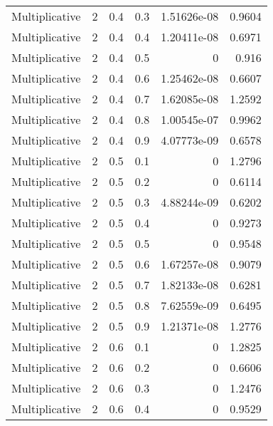 \documentclass{article}
\begin{document}
\begin{longtable}[H]{lrrrrr}
 Multiplicative &       2 &   0.4 &            0.3 &      1.51626e-08 &          0.9604 \\
 Multiplicative &       2 &   0.4 &            0.4 &      1.20411e-08 &          0.6971 \\
 Multiplicative &       2 &   0.4 &            0.5 &      0           &          0.916  \\
 Multiplicative &       2 &   0.4 &            0.6 &      1.25462e-08 &          0.6607 \\
 Multiplicative &       2 &   0.4 &            0.7 &      1.62085e-08 &          1.2592 \\
 Multiplicative &       2 &   0.4 &            0.8 &      1.00545e-07 &          0.9962 \\
 Multiplicative &       2 &   0.4 &            0.9 &      4.07773e-09 &          0.6578 \\
 Multiplicative &       2 &   0.5 &            0.1 &      0           &          1.2796 \\
 Multiplicative &       2 &   0.5 &            0.2 &      0           &          0.6114 \\
 Multiplicative &       2 &   0.5 &            0.3 &      4.88244e-09 &          0.6202 \\
 Multiplicative &       2 &   0.5 &            0.4 &      0           &          0.9273 \\
 Multiplicative &       2 &   0.5 &            0.5 &      0           &          0.9548 \\
 Multiplicative &       2 &   0.5 &            0.6 &      1.67257e-08 &          0.9079 \\
 Multiplicative &       2 &   0.5 &            0.7 &      1.82133e-08 &          0.6281 \\
 Multiplicative &       2 &   0.5 &            0.8 &      7.62559e-09 &          0.6495 \\
 Multiplicative &       2 &   0.5 &            0.9 &      1.21371e-08 &          1.2776 \\
 Multiplicative &       2 &   0.6 &            0.1 &      0           &          1.2825 \\
 Multiplicative &       2 &   0.6 &            0.2 &      0           &          0.6606 \\
 Multiplicative &       2 &   0.6 &            0.3 &      0           &          1.2476 \\
 Multiplicative &       2 &   0.6 &            0.4 &      0           &          0.9529 \\

\end{longtable}
\end{document}
